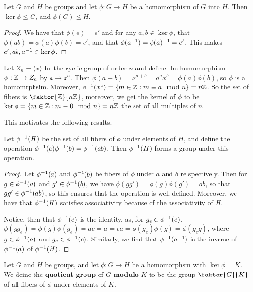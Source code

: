 \begin{lemma}\label{lemma_3.1.2}
  Let $G$ and  $H$ be groups and let  $\phi:G \rightarrow H$ be a homomorphism
  of $G$ into  $H$. Then $\ker{\phi} \leq G$, and $\phi(G) \leq H$.
\end{lemma}
\begin{proof}
  We have that $\phi(e)=e'$ and for any $a,b \in \ker{\phi}$, that
  $\phi(ab)=\phi(a)\phi(b)=e'$, and that $\phi(a^{-1})=\phi(a)^{-1}=e'$.
  This makes $e',ab, a^{-1} \in \ker{\phi}$.
\end{proof}

\begin{example}\label{example_3.1}
  Let $Z_n=\langle x \rangle$ be the cyclic group of order $n$ and define the
  homomorphism  $\phi:\mathbb{Z} \rightarrow Z_n$ by $a \rightarrow x^a$. Then
  $\phi(a+b)=x^{a+b}=a^ax^b=\phi(a)\phi(b)$, so $\phi$ is a homomrphsim.
  Moreover,  $\phi^{-1}(x^a)=\{m \in \mathbb{Z} : m \equiv a \mod{n}\}=n\mathbb{Z}$. So the
  set of fibers is $\faktor{\Z}{n\Z}$, moreover, we get the kernel of $\phi$
  to be  $\ker{\phi}=\{m \in \mathbb{Z} : m \equiv 0 \mod{n}\}=n\mathbb{Z}$ the set of all
  multiples of $n$.
\end{example}

This motivates the following results.

\begin{theorem}\label{theorem_3.1.3}
  Let $\phi^{-1}(H)$ be the set of all fibers of $\phi$ under elements of
  $H$, and define the operation $\phi^{-1}(a)\phi^{-1}(b)=\phi^{-1}(ab)$.
  Then $\phi^{-1}(H)$ forms a group under this operation.
\end{theorem}
\begin{proof}
  Let $\phi^{-1}(a)$ and $\phi^{-1}(b)$ be fibers of  $\phi$ under  $a$ and
  $b$ re spectively. Then for $g \in \phi^{-1}(a)$ and  $g' \in
  \phi^{-1}(b)$, we have  $\phi(gg')=\phi(g)\phi(g')=ab$, so that $gg' \in
  \phi^{-1}(ab)$, so this ensures that the operation is well defined.
  Moreover, we have that $\phi^{-1}(H)$ satisfies associativity because of
  the associativity of  $H$.

  Notice, then that  $\phi^{-1}(e)$ is the identity, as, for $g_e \in
  \phi^{-1}(e)$, $\phi(gg_e)=\phi(g)\phi(g_e)=ae=a=ea=\phi(g_e)\phi(g)=
  \phi(g_eg)$, where $g \in \phi^{-1}(a)$ and $g_e \in \phi^{-1}(e)$.
  Similarly, we find that $\phi^{-1}(a^{-1})$ is the inverse of $\phi^{-1}(a)$
  of $\phi^{-1}(H)$.
\end{proof}

\begin{definition}
  Let $G$ and  $H$ be groups, and let  $\phi:G \rightarrow H$ be a homomorphsm
  with $\ker{\phi}=K$. We deine the \textbf{quotient group} of $G$
  \textbf{modulo} $K$ to be the group $\faktor{G}{K}$ of all fibers of $\phi$
  under elements of $K$.
\end{definition}

